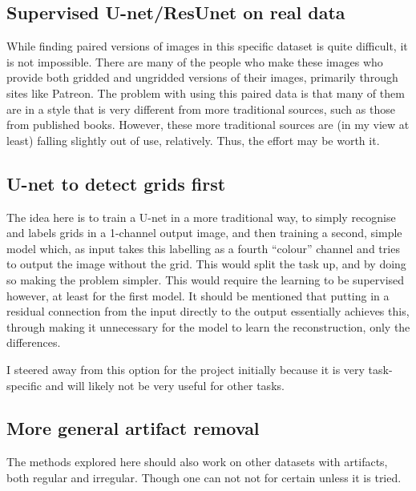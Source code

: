 \subsection{Supervised U-net/ResUnet on real data}
While finding paired versions of images in this specific dataset is quite difficult, it is not impossible. There are many of the people who make these images who provide both gridded and ungridded versions of their images, primarily through sites like Patreon. The problem with using this paired data is that many of them are in a style that is very different from more traditional sources, such as those from published books. However, these more traditional sources are (in my view at least) falling slightly out of use, relatively. Thus, the effort may be worth it.

\subsection{U-net to detect grids first}
The idea here is to train a U-net in a more traditional way, to simply recognise and labels grids in a 1-channel output image, and then training a second, simple model which, as input takes this labelling as a fourth ``colour'' channel and tries to output the image without the grid. This would split the task up, and by doing so making the problem simpler. This would require the learning to be supervised however, at least for the first model. It should be mentioned that putting in a residual connection from the input directly to the output essentially achieves this, through making it unnecessary for the model to learn the reconstruction, only the differences.

I steered away from this option for the project initially because it is very task-specific and will likely not be very useful for other tasks.

\subsection{More general artifact removal}
The methods explored here should also work on other datasets with artifacts, both regular and irregular. Though one can not not for certain unless it is tried.
